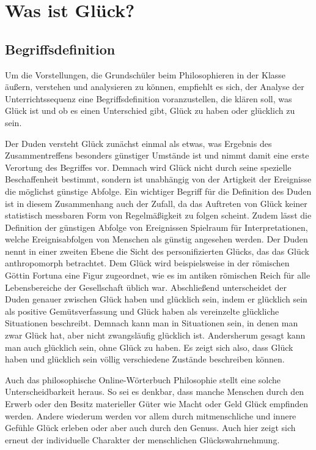 \section{Was ist Glück?}
\subsection{Begriffsdefinition}

Um die Vorstellungen, die Grundschüler beim Philosophieren in der Klasse äußern, verstehen und analysieren zu können, empfiehlt es sich, der Analyse der Unterrichtssequenz eine Begriffsdefinition voranzustellen, die klären soll, was Glück ist und ob es einen Unterschied gibt, Glück zu \glqq haben\grqq{} oder \glqq glücklich\grqq{} zu sein.

Der Duden versteht Glück zunächst einmal als \glqq etwas, was Ergebnis des Zusammentreffens besonders günstiger Umstände ist\grqq{}\cite{D16} und nimmt damit eine erste Verortung des Begriffes vor. 
Demnach wird Glück nicht durch seine spezielle Beschaffenheit bestimmt, sondern ist unabhängig von der Artigkeit der Ereignisse die möglichst günstige Abfolge.
 Ein wichtiger Begriff für die Definition des Duden ist in diesem Zusammenhang auch der Zufall, da das Auftreten von Glück keiner statistisch messbaren Form von Regelmäßigkeit zu folgen scheint. 
 Zudem lässt die Definition der \glqq günstigen Abfolge von Ereignissen\grqq{} Spielraum für Interpretationen, welche Ereignisabfolgen von Menschen als günstig angesehen werden.  
 Der Duden nennt in einer zweiten Ebene die Sicht des personifizierten Glücks, das das Glück anthropomorph betrachtet. 
 Dem Glück wird beispielsweise in der römischen Göttin Fortuna eine Figur zugeordnet, wie es im antiken römischen Reich für alle Lebensbereiche der Gesellschaft üblich war. 
 Abschließend unterscheidet der Duden genauer zwischen Glück haben und glücklich sein, indem er \glqq glücklich sein\grqq{} als positive Gemütsverfassung und \glqq Glück haben\grqq{} als vereinzelte glückliche Situationen beschreibt\cite{D16}.
  Demnach kann man in Situationen sein, in denen man zwar Glück hat, aber nicht zwangsläufig glücklich ist. 
 Andersherum gesagt kann man auch glücklich sein, ohne Glück zu haben. 
 Es zeigt sich also, dass \glqq Glück haben\grqq{} und \glqq glücklich sein\grqq{} völlig verschiedene Zustände beschreiben können. 
 
Auch das philosophische Online-Wörterbuch Philosophie stellt eine solche Unterscheidbarkeit heraus. 
So sei es denkbar, dass manche Menschen durch den Erwerb oder den Besitz materieller Güter wie Macht oder Geld Glück empfinden werden. 
Andere wiederum werden vor allem durch mitmenschliche und innere Gefühle Glück erleben oder aber auch durch den Genuss\cite{GT16}. 
Auch hier zeigt sich erneut der individuelle Charakter der menschlichen Glückswahrnehmung. 

